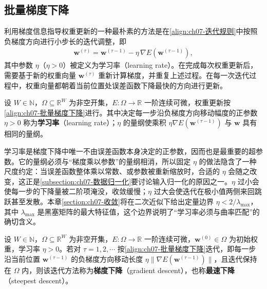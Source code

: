 \documentclass[../../main.tex]{subfiles}
\begin{document}
\subsection{批量梯度下降}\label{subsection:ch07-批量梯度下降}

利用梯度信息指导权重更新的一种最朴素的方法是在\eqref{align:ch07-迭代规则}中按照负梯度方向进行小步长的迭代调整，即
\begin{align}
\mathbf{w}^{(\tau)} = \mathbf{w}^{(\tau-1)}-\eta\,\nabla E(\mathbf{w}^{(\tau-1)}),
\label{align:ch07-批量梯度下降}
\end{align}
其中参数 $\eta$（$\eta>0$）被定义为学习率（learning rate）。在完成每次权重更新后，需要基于新的权重向量 $\mathbf{w}^{(\tau)}$ 重新计算梯度，并重复上述过程。在每一次迭代过程中，权重向量都朝着当前位置处误差函数下降最快的方向进行更新。

\begin{definition}[学习率]\label{definition:ch07-学习率}
设 $W\in\mathbb{N}$，$\Omega\subseteq\mathbb{R}^{W}$ 为非空开集，$E:\Omega\to\mathbb{R}$ 一阶连续可微，权重更新按\eqref{align:ch07-批量梯度下降}进行。其中决定每一步沿负梯度方向移动幅度的正参数 $\eta>0$ 称为\textbf{学习率}（learning rate）；$\eta$ 的量纲使乘积 $\eta\nabla E(\mathbf{w}^{(\tau-1)})$ 与 $\mathbf{w}$ 具有相同的量纲。
\end{definition}

\begin{remark}
学习率是梯度下降中唯一不由误差函数本身决定的正参数，因而也是最重要的超参数。它的量纲必须与“梯度乘以参数”的量纲相消，所以固定 $\eta$ 的做法隐含了一种尺度约定：当误差函数整体乘以常数、或参数被重新缩放时，合适的 $\eta$ 会随之改变，这正是\cref{subsection:ch07-数据归一化}要讨论输入归一化的原因之一。$\eta$ 过小会使每一步的下降量被二阶项淹没，收敛缓慢；$\eta$ 过大会使迭代在极小值两侧来回跳跃甚至发散。本章\cref{section:ch07-收敛}将在二次近似下给出定量边界 $\eta<2/\lambda_{\max}$，其中 $\lambda_{\max}$ 是黑塞矩阵的最大特征值，这个边界说明了“学习率必须与曲率匹配”的确切含义。
\end{remark}

\begin{definition}[梯度下降与最速下降]\label{definition:ch07-梯度下降}
设 $W\in\mathbb{N}$，$\Omega\subseteq\mathbb{R}^{W}$ 为非空开集，$E:\Omega\to\mathbb{R}$ 一阶连续可微，$\mathbf{w}^{(0)}\in\Omega$ 为初始权重，学习率 $\eta>0$。若对 $\tau=1,2,\cdots$ 按\eqref{align:ch07-批量梯度下降}迭代，即每一步沿当前位置 $\mathbf{w}^{(\tau-1)}$ 的负梯度方向移动长度 $\eta\|\nabla E(\mathbf{w}^{(\tau-1)})\|$，且迭代保持在 $\Omega$ 内，则该迭代方法称为\textbf{梯度下降}（gradient descent），也称\textbf{最速下降}（steepest descent）。
\end{definition}
\end{document}
